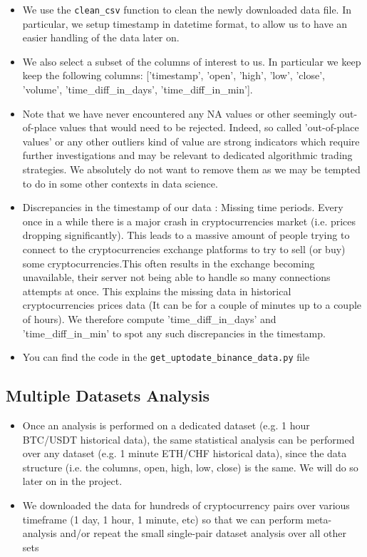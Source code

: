\documentclass[twoside]{report}
\newcommand{\code}{\texttt}
\begin{document}
\begin{spacing}{1}
\begin{itemize}
    \item 
We use the \code{clean\_csv} function to clean the newly downloaded data file. In particular, we setup timestamp in datetime format, to allow us to have an easier handling of the data later on.
    \item
We also select a subset of the columns of interest to us. In particular we keep keep the following columns: ['timestamp', 'open', 'high', 'low', 'close', 'volume', 'time\_diff\_in\_days', 'time\_diff\_in\_min'].
    \item
Note that we have never encountered any NA values or other seemingly out-of-place values that would need to be rejected. Indeed, so called 'out-of-place values' or any other outliers kind of value are strong indicators which require further investigations and may be relevant to dedicated algorithmic trading strategies. We absolutely do not want to remove them as we may be tempted to do in some other contexts in data science.
    \item
Discrepancies in the timestamp of our data : Missing time periods. Every once in a while there is a major crash in cryptocurrencies market (i.e. prices dropping significantly). This leads to a massive amount of people trying to connect to the cryptocurrencies exchange platforms to try to sell (or buy) some cryptocurrencies.This often results in the exchange becoming unavailable, their server not being able to handle so many connections attempts at once. This explains the missing data in historical cryptocurrencies prices data (It can be for a couple of minutes up to a couple of hours). We therefore compute 'time\_diff\_in\_days' and 'time\_diff\_in\_min' to spot any such discrepancies in the timestamp.
    \item
You can find the code in the \code{get\_uptodate\_binance\_data.py} file

\end{itemize}


\subsection{Multiple Datasets Analysis
}

\begin{itemize}
    \item 
Once an analysis is performed on a dedicated dataset (e.g. 1 hour BTC/USDT historical data), the same statistical analysis can be performed over any dataset (e.g. 1 minute ETH/CHF historical data), since the data structure (i.e. the columns, open, high, low, close) is the same. We will do so later on in the project.
    \item
We downloaded the data for hundreds of cryptocurrency pairs over various timeframe (1 day, 1 hour, 1 minute, etc) so that we can perform meta-analysis and/or repeat the small single-pair dataset analysis over all other sets


\end{itemize}
\end{spacing}
\end{document}
